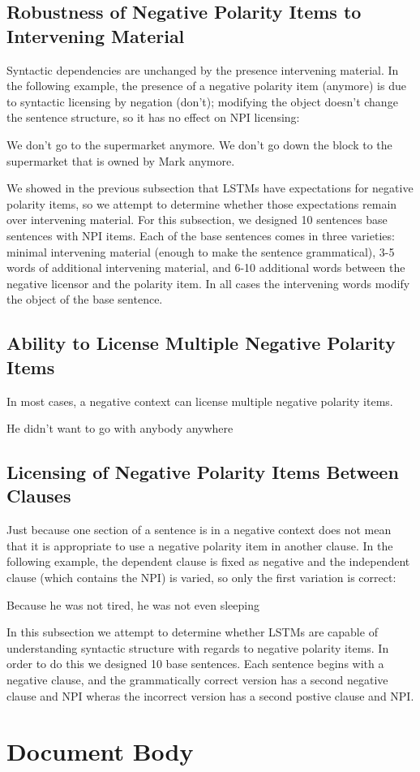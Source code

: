 \documentclass[11pt]{article}
\begin{document}
\subsection{Robustness of Negative Polarity Items to Intervening Material}
Syntactic dependencies are unchanged by the presence intervening material. In the following example, the presence of a negative polarity item (anymore) is due to syntactic licensing by negation (don't); modifying the object doesn't change the sentence structure, so it has no effect on NPI licensing:
\begin{exe}
\ex
\begin{xlist}
\ex We don't go to the supermarket anymore.
\ex We don't go down the block to the supermarket that is owned by Mark anymore. 
\end{xlist}
\end{exe}
We showed in the previous subsection that LSTMs have expectations for negative polarity items, so we attempt to determine whether those expectations remain over intervening material. For this subsection, we designed 10 sentences base sentences with NPI items. Each of the base sentences comes in three varieties: minimal intervening material (enough to make the sentence grammatical), 3-5 words of additional intervening material, and 6-10 additional words between the negative licensor and the polarity item. In all cases the intervening words modify the object of the base sentence.
\subsection{Ability to License Multiple Negative Polarity Items}
In most cases, a negative context can license multiple negative polarity items.
\begin{exe}
\ex
\begin{xlist}
\ex He didn't want to go with anybody anywhere
\end{xlist}
\end{exe}

\subsection{Licensing of Negative Polarity Items Between Clauses}
Just because one section of a sentence is in a negative context does not mean that it is appropriate to use a negative polarity item in another clause. In the following example, the dependent clause is fixed as negative and the independent clause (which contains the NPI) is varied, so only the first variation is correct:
\begin{exe}
\ex
\begin{xlist}
\ex Because he was not tired, he was not even sleeping
\end{xlist}
\end{exe}
In this subsection we attempt to determine whether LSTMs are capable of understanding syntactic structure with regards to negative polarity items. In order to do this we designed 10 base sentences. Each sentence begins with a negative clause, and the grammatically correct version has a second negative clause and NPI wheras the incorrect version has a second postive clause and NPI.
\section{Document Body}
\end{document}
